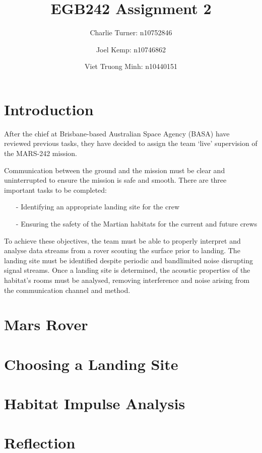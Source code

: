 \documentclass[a4paper]{article}
\author{
    Charlie Turner: n10752846
    \and
    Joel Kemp: n10746862
    \and
    Viet Truong Minh: n10440151
}
\title{EGB242 Assignment 2}
\begin{document}
\begin{titlepage}
    \maketitle
\end{titlepage}

\section{Introduction}

After the chief at Brisbane-based Australian Space Agency (BASA) have reviewed
previous tasks, they have decided to assign the team `live' supervision of the
MARS-242 mission.

Communication between the ground and the mission must be clear and
uninterrupted to ensure the mission is safe and smooth. There are three
important tasks to be completed:
\begin{itemize}
    \item[-] Identifying an appropriate landing site for the crew
    \item[-] Ensuring the safety of the Martian habitats for the current and future crews
\end{itemize}

\noindent To achieve these objectives, the team must be able to properly interpret and
analyse data streams from a rover scouting the surface prior to landing.
The landing site must be identified despite periodic and bandlimited noise
disrupting signal streams. Once a landing site is determined, the acoustic
properties of the habitat's rooms must be analysed, removing interference and
noise arising from the communication channel and method.

\section{Mars Rover}
\section{Choosing a Landing Site}
\section{Habitat Impulse Analysis}
\section{Reflection}
\end{document}
